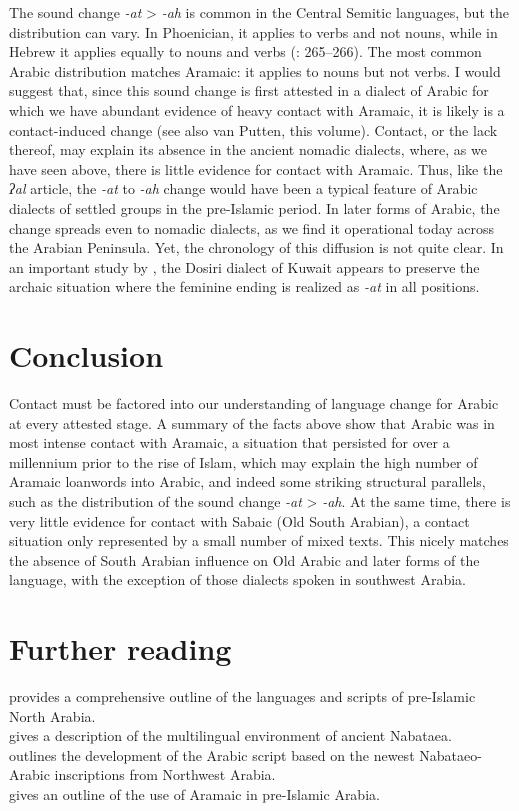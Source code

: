 \documentclass[output=paper]{langsci/langscibook}
\begin{document}
The sound change \textit{-at} > \textit{-ah} is common in the Central Semitic languages, but the distribution can vary. In Phoenician, it applies to verbs and not nouns, while in Hebrew it applies equally to nouns and verbs (\citealt{HuehnergardRubin2011}: 265--266). The most common Arabic distribution matches Aramaic: it applies to nouns but not verbs. I would suggest that, since this sound change is first attested in a dialect of Arabic for which we have abundant evidence of heavy contact with Aramaic, it is likely is a contact-induced change (see also van Putten, this volume). Contact, or the lack thereof, may explain its absence in the ancient nomadic dialects, where, as we have seen above, there is little evidence for contact with Aramaic. Thus, like the \textit{ʔal} article, the \textit{-at} to \textit{-ah} change would have been a typical feature of Arabic dialects of settled groups in the pre-Islamic period. In later forms of Arabic, the change spreads even to nomadic dialects, as we find it operational today across the Arabian Peninsula. Yet, the chronology of this diffusion is not quite clear. In an important study by \citet{vanPutten2017}, the Dosiri dialect of Kuwait appears to preserve the archaic situation where the feminine ending is realized as \textit{-at} in all positions.

\section{Conclusion}
Contact must be factored into our understanding of language change for Arabic at every attested stage. A summary of the facts above show that Arabic was in most intense contact with Aramaic, a situation that persisted for over a millennium prior to the rise of Islam, which may explain the high number of Aramaic loanwords into Arabic, and indeed some striking structural parallels, such as the distribution of the sound change \textit{-at} > \textit{-ah}. At the same time, there is very little evidence for contact with Sabaic (Old South Arabian), a contact situation only represented by a small number of mixed texts.  This nicely matches the absence of South Arabian influence on Old Arabic and later forms of the language, with the exception of those dialects spoken in southwest Arabia.

\section*{Further reading}
\citet{Al-Jallad2018ANA} provides a comprehensive outline of the languages and scripts of pre-Islamic North Arabia.\\
\citet{Macdonald2003} gives a description of the multilingual environment of ancient Nabataea. \\
\citet{Nehmé2010} outlines the development of the Arabic script based on the newest Nabataeo-Arabic inscriptions from Northwest Arabia.\\
\citet{Stein2018} gives an outline of the use of Aramaic in pre-Islamic Arabia.
\end{document}
